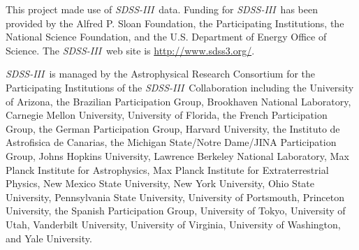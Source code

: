\documentclass[12pt, preprint]{aastex6}
\newcommand{\project}[1]{\textsl{#1}}
\newcommand{\acronym}[1]{{\small{#1}}}
\newcommand{\sdssiii}{\project{\acronym{SDSS-III}}}
\begin{document}
This project made use of \sdssiii\ data. Funding for \sdssiii\ has been provided
by the Alfred P. Sloan Foundation, the Participating Institutions, the National
Science Foundation, and the \acronym{U.S.} Department of Energy Office of
Science. The \sdssiii\ web site is \url{http://www.sdss3.org/}.

\sdssiii\ is managed by the Astrophysical Research Consortium for the
Participating Institutions of the \sdssiii\ Collaboration including the
University of Arizona, the Brazilian Participation Group, Brookhaven National
Laboratory, Carnegie Mellon University, University of Florida, the French
Participation Group, the German Participation Group, Harvard University, the
Instituto de Astrofisica de Canarias, the Michigan State/Notre
Dame/\acronym{JINA} Participation Group, Johns Hopkins University, Lawrence
Berkeley National Laboratory, Max Planck Institute for Astrophysics, Max Planck
Institute for Extraterrestrial Physics, New Mexico State University, New York
University, Ohio State University, Pennsylvania State University, University of
Portsmouth, Princeton University, the Spanish Participation Group, University of
Tokyo, University of Utah, Vanderbilt University, University of Virginia,
University of Washington, and Yale University.




\end{document}
